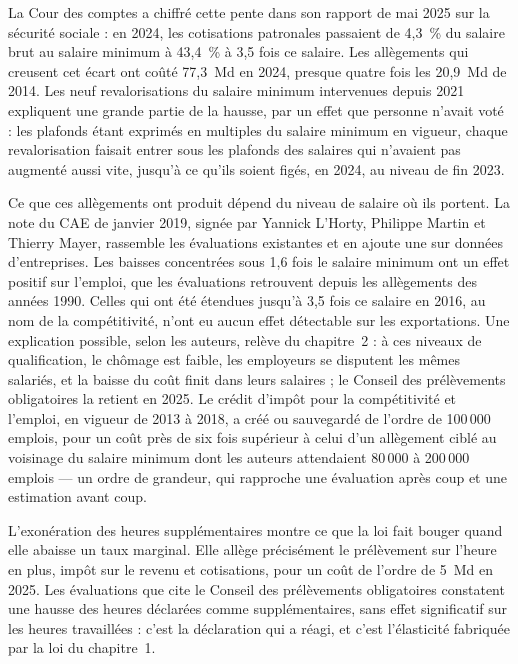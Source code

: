 \documentclass[11pt,a4paper]{article}
\providecommand{\euro}{\texteuro}
\begin{document}
La Cour des comptes a chiffré cette pente dans son rapport de mai 2025 sur la sécurité sociale : en
2024, les cotisations patronales passaient de 4,3~\% du salaire brut au salaire minimum à 43,4~\% à
3,5 fois ce salaire. Les allègements qui creusent cet écart ont coûté 77,3~Md\euro{} en 2024, presque
quatre fois les 20,9~Md\euro{} de 2014. Les neuf revalorisations du salaire minimum intervenues
depuis 2021 expliquent une grande partie de la hausse, par un effet que personne n'avait voté : les
plafonds étant exprimés en multiples du salaire minimum en vigueur, chaque revalorisation faisait
entrer sous les plafonds des salaires qui n'avaient pas augmenté aussi vite, jusqu'à ce qu'ils
soient figés, en 2024, au niveau de fin 2023.

Ce que ces allègements ont produit dépend du niveau de salaire où ils portent. La note du CAE de
janvier 2019, signée par Yannick L'Horty, Philippe Martin et Thierry Mayer, rassemble les
évaluations existantes et en ajoute une sur données d'entreprises. Les baisses concentrées sous
1,6 fois le salaire minimum ont un effet positif sur l'emploi, que les évaluations retrouvent depuis
les allègements des années 1990. Celles qui ont été étendues jusqu'à 3,5 fois ce salaire en 2016,
au nom de la compétitivité, n'ont eu aucun effet détectable sur les exportations. Une explication
possible, selon les auteurs, relève du chapitre~2 : à ces niveaux de qualification, le chômage est
faible, les employeurs se disputent les mêmes salariés, et la baisse du coût finit dans leurs
salaires ; le Conseil des prélèvements obligatoires la retient en 2025. Le crédit d'impôt pour la
compétitivité et l'emploi, en vigueur de 2013 à 2018, a créé ou sauvegardé de l'ordre de
100\,000 emplois, pour un coût près de six fois supérieur à celui d'un allègement ciblé au
voisinage du salaire minimum dont les auteurs attendaient 80\,000 à 200\,000 emplois --- un ordre de
grandeur, qui rapproche une évaluation après coup et une estimation avant coup.

L'exonération des heures supplémentaires montre ce que la loi fait bouger quand elle abaisse un
taux marginal. Elle allège précisément le prélèvement sur l'heure en plus, impôt sur le revenu et
cotisations, pour un coût de l'ordre de 5~Md\euro{} en 2025. Les évaluations que cite le Conseil
des prélèvements obligatoires constatent une hausse des heures déclarées comme supplémentaires,
sans effet significatif sur les heures travaillées : c'est la déclaration qui a réagi, et c'est
l'élasticité fabriquée par la loi du chapitre~1.
\end{document}
